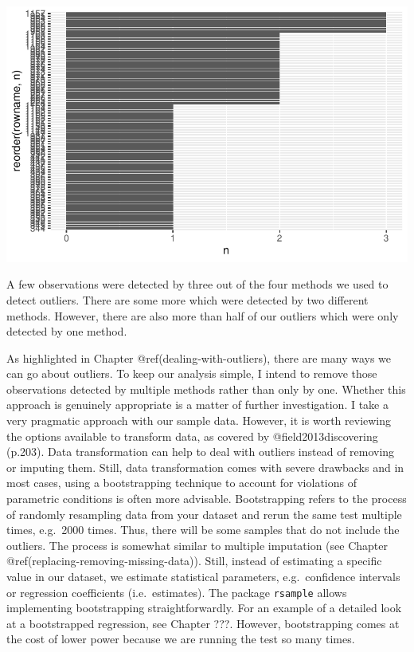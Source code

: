 \documentclass[
  letterpaper,
]{krantz}
\begin{document}
\includegraphics{13_regressions_files/figure-pdf/number-of-outliers-plot-1.pdf}

A few observations were detected by three out of the four methods we
used to detect outliers. There are some more which were detected by two
different methods. However, there are also more than half of our
outliers which were only detected by one method.

As highlighted in Chapter @ref(dealing-with-outliers), there are many
ways we can go about outliers. To keep our analysis simple, I intend to
remove those observations detected by multiple methods rather than only
by one. Whether this approach is genuinely appropriate is a matter of
further investigation. I take a very pragmatic approach with our sample
data. However, it is worth reviewing the options available to transform
data, as covered by @field2013discovering (p.203). Data transformation
can help to deal with outliers instead of removing or imputing them.
Still, data transformation comes with severe drawbacks and in most
cases, using a bootstrapping technique to account for violations of
parametric conditions is often more advisable. Bootstrapping refers to
the process of randomly resampling data from your dataset and rerun the
same test multiple times, e.g.~2000 times. Thus, there will be some
samples that do not include the outliers. The process is somewhat
similar to multiple imputation (see Chapter
@ref(replacing-removing-missing-data)). Still, instead of estimating a
specific value in our dataset, we estimate statistical parameters,
e.g.~confidence intervals or regression coefficients (i.e.~estimates).
The package \texttt{rsample} allows implementing bootstrapping
straightforwardly. For an example of a detailed look at a bootstrapped
regression, see Chapter ???. However, bootstrapping comes at the cost of
lower power because we are running the test so many times.
\end{document}

